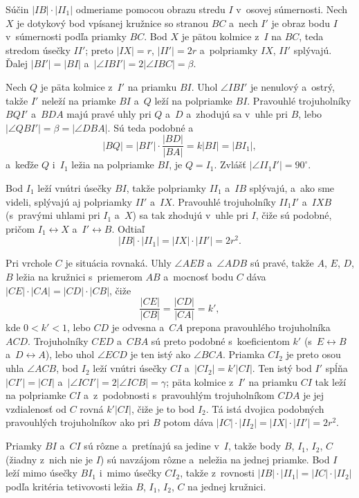 {    Súčin $|IB| \cdot |II_1|$ odmeriame pomocou obrazu stredu $I$ v~osovej súmernosti. Nech $X$ je dotykový bod vpísanej kružnice so stranou $BC$ a~nech $I'$ je obraz bodu $I$ v~súmernosti podľa priamky $BC$. Bod $X$ je pätou kolmice z~$I$ na $BC$, teda stredom úsečky $II'$; preto $|IX| = r$, $|II'| = 2r$ a~polpriamky $IX$, $II'$ splývajú. Ďalej $|BI'| = |BI|$ a~$|\angle IBI'| = 2|\angle IBC| = \beta$.

    Nech $Q$ je päta kolmice z~$I'$ na priamku $BI$. Uhol $\angle IBI'$ je nenulový a~ostrý, takže $I'$ neleží na priamke $BI$ a~$Q$ leží na polpriamke $BI$. Pravouhlé trojuholníky $BQI'$ a~$BDA$ majú pravé uhly pri $Q$ a~$D$ a~zhodujú sa v~uhle pri $B$, lebo $|\angle QBI'| = \beta = |\angle DBA|$. Sú teda podobné a
    $$
    |BQ| = |BI'| \cdot \frac{|BD|}{|BA|} = k|BI| = |BI_1|,
    $$
    a~keďže $Q$ i~$I_1$ ležia na polpriamke $BI$, je $Q = I_1$. Zvlášť $|\angle II_1I'| = 90^\circ$.

    Bod $I_1$ leží vnútri úsečky $BI$, takže polpriamky $II_1$ a~$IB$ splývajú, a~ako sme videli, splývajú aj polpriamky $II'$ a~$IX$. Pravouhlé trojuholníky $II_1I'$ a~$IXB$ (s~pravými uhlami pri $I_1$ a~$X$) sa tak zhodujú v~uhle pri $I$, čiže sú podobné, pričom $I_1 \leftrightarrow X$ a~$I' \leftrightarrow B$. Odtiaľ
    $$
    |IB| \cdot |II_1| = |IX| \cdot |II'| = 2r^2.
    $$

    Pri vrchole $C$ je situácia rovnaká. Uhly $\angle AEB$ a~$\angle ADB$ sú pravé, takže $A$, $E$, $D$, $B$ ležia na kružnici s~priemerom $AB$ a~mocnosť bodu $C$ dáva $|CE| \cdot |CA| = |CD| \cdot |CB|$, čiže
    $$
    \frac{|CE|}{|CB|} = \frac{|CD|}{|CA|} = k',
    $$
    kde $0 < k' < 1$, lebo $CD$ je odvesna a~$CA$ prepona pravouhlého trojuholníka $ACD$. Trojuholníky $CED$ a~$CBA$ sú preto podobné s~koeficientom $k'$ (s~$E \leftrightarrow B$ a~$D \leftrightarrow A$), lebo uhol $\angle ECD$ je ten istý ako $\angle BCA$. Priamka $CI_2$ je preto osou uhla $\angle ACB$, bod $I_2$ leží vnútri úsečky $CI$ a~$|CI_2| = k'|CI|$. Ten istý bod $I'$ spĺňa $|CI'| = |CI|$ a~$|\angle ICI'| = 2|\angle ICB| = \gamma$; päta kolmice z~$I'$ na priamku $CI$ tak leží na polpriamke $CI$ a~z~podobnosti s~pravouhlým trojuholníkom $CDA$ je jej vzdialenosť od $C$ rovná $k'|CI|$, čiže je to bod $I_2$. Tá istá dvojica podobných pravouhlých trojuholníkov ako pri $B$ potom dáva $|IC| \cdot |II_2| = |IX| \cdot |II'| = 2r^2$.

    Priamky $BI$ a~$CI$ sú rôzne a~pretínajú sa jedine v~$I$, takže body $B$, $I_1$, $I_2$, $C$ (žiadny z~nich nie je $I$) sú navzájom rôzne a~neležia na jednej priamke. Bod $I$ leží mimo úsečky $BI_1$ i~mimo úsečky $CI_2$, takže z~rovnosti $|IB| \cdot |II_1| = |IC| \cdot |II_2|$ podľa kritéria tetivovosti ležia $B$, $I_1$, $I_2$, $C$ na jednej kružnici.

}
